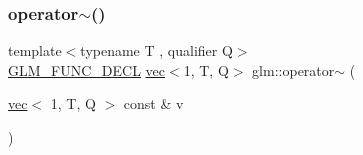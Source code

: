 \subsubsection{\texorpdfstring{operator$\sim$()}{operator~()}}
{\footnotesize\ttfamily template$<$typename T , qualifier Q$>$ \\
\mbox{\hyperlink{setup_8hpp_ab2d052de21a70539923e9bcbf6e83a51}{G\+L\+M\+\_\+\+F\+U\+N\+C\+\_\+\+D\+E\+CL}} \mbox{\hyperlink{structglm_1_1vec}{vec}}$<$1, T, Q$>$ glm\+::operator$\sim$ (\begin{DoxyParamCaption}\item[{\mbox{\hyperlink{structglm_1_1vec}{vec}}$<$ 1, T, Q $>$ const \&}]{v }\end{DoxyParamCaption})}

